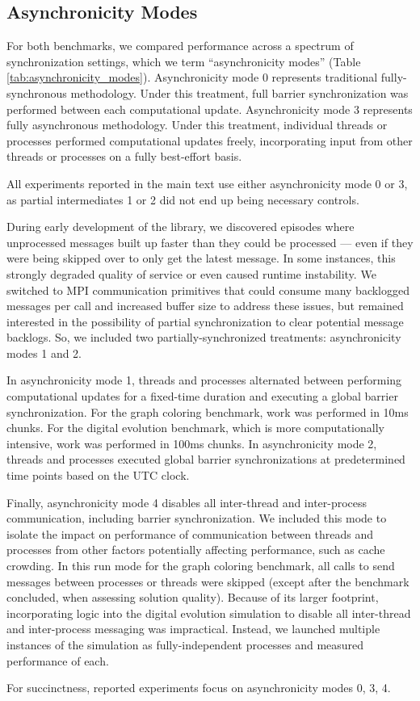 \subsection{Asynchronicity Modes} \label{sec:asynchronicity_modes}


For both benchmarks, we compared performance across a spectrum of synchronization settings, which we term ``asynchronicity modes'' (Table \ref{tab:asynchronicity_modes}).
Asynchronicity mode 0 represents traditional fully-synchronous methodology.
Under this treatment, full barrier synchronization was performed between each computational update.
Asynchronicity mode 3 represents fully asynchronous methodology.
Under this treatment, individual threads or processes performed computational updates freely, incorporating input from other threads or processes on a fully best-effort basis.

All experiments reported in the main text use either asynchronicity mode 0 or 3, as partial intermediates 1 or 2 did not end up being necessary controls.

During early development of the library, we discovered episodes where unprocessed messages built up faster than they could be processed --- even if they were being skipped over to only get the latest message.
In some instances, this strongly degraded quality of service or even caused runtime instability.
We switched to MPI communication primitives that could consume many backlogged messages per call and increased buffer size to address these issues, but remained interested in the possibility of partial synchronization to clear potential message backlogs.
So, we included two partially-synchronized treatments: asynchronicity modes 1 and 2.

In asynchronicity mode 1, threads and processes alternated between performing computational updates for a fixed-time duration and executing a global barrier synchronization.
For the graph coloring benchmark, work was performed in 10ms chunks.
For the digital evolution benchmark, which is more computationally intensive, work was performed in 100ms chunks.
In asynchronicity mode 2, threads and processes executed global barrier synchronizations at predetermined time points based on the UTC clock.

Finally, asynchronicity mode 4 disables all inter-thread and inter-process communication, including barrier synchronization.
We included this mode to isolate the impact on performance of communication between threads and processes from other factors potentially affecting performance, such as cache crowding.
In this run mode for the graph coloring benchmark, all calls to send messages between processes or threads were skipped (except after the benchmark concluded, when assessing solution quality).
Because of its larger footprint, incorporating logic into the digital evolution simulation to disable all inter-thread and inter-process messaging was impractical.
Instead, we launched multiple instances of the simulation as fully-independent processes and measured performance of each.

For succinctness, reported experiments focus on asynchronicity modes 0, 3, 4.
